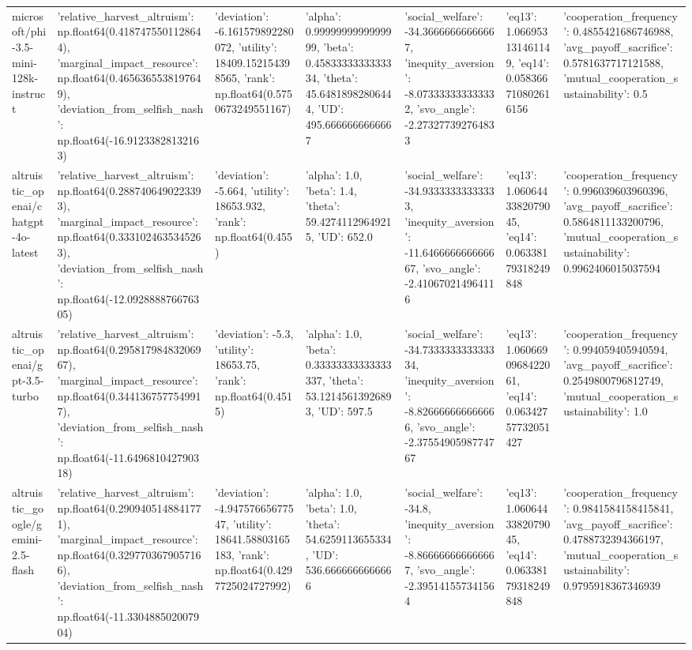 \begin{table}
\begin{tabular}{lllllll}
microsoft/phi-3.5-mini-128k-instruct & {'relative_harvest_altruism': np.float64(0.4187475501128644), 'marginal_impact_resource': np.float64(0.4656365538197649), 'deviation_from_selfish_nash': np.float64(-16.91233828132163)} & {'deviation': -6.161579892280072, 'utility': 18409.152154398565, 'rank': np.float64(0.5750673249551167)} & {'alpha': 0.9999999999999999, 'beta': 0.4583333333333334, 'theta': 45.64818982806444, 'UD': 495.6666666666667} & {'social_welfare': -34.36666666666667, 'inequity_aversion': -8.073333333333332, 'svo_angle': -2.273277392764833} & {'eq13': 1.066953131461149, 'eq14': 0.058366710802616156} & {'cooperation_frequency': 0.4855421686746988, 'avg_payoff_sacrifice': 0.5781637717121588, 'mutual_cooperation_sustainability': 0.5} \\
altruistic_openai/chatgpt-4o-latest & {'relative_harvest_altruism': np.float64(0.2887406490223393), 'marginal_impact_resource': np.float64(0.3331024635345263), 'deviation_from_selfish_nash': np.float64(-12.092888876676305)} & {'deviation': -5.664, 'utility': 18653.932, 'rank': np.float64(0.455)} & {'alpha': 1.0, 'beta': 1.4, 'theta': 59.42741129649215, 'UD': 652.0} & {'social_welfare': -34.93333333333333, 'inequity_aversion': -11.646666666666667, 'svo_angle': -2.410670214964116} & {'eq13': 1.0606443382079045, 'eq14': 0.06338179318249848} & {'cooperation_frequency': 0.996039603960396, 'avg_payoff_sacrifice': 0.5864811133200796, 'mutual_cooperation_sustainability': 0.9962406015037594} \\
altruistic_openai/gpt-3.5-turbo & {'relative_harvest_altruism': np.float64(0.29581798483206967), 'marginal_impact_resource': np.float64(0.3441367577549917), 'deviation_from_selfish_nash': np.float64(-11.649681042790318)} & {'deviation': -5.3, 'utility': 18653.75, 'rank': np.float64(0.4515)} & {'alpha': 1.0, 'beta': 0.33333333333333337, 'theta': 53.12145613926893, 'UD': 597.5} & {'social_welfare': -34.733333333333334, 'inequity_aversion': -8.826666666666666, 'svo_angle': -2.3755490598774767} & {'eq13': 1.0606690968422061, 'eq14': 0.06342757732051427} & {'cooperation_frequency': 0.994059405940594, 'avg_payoff_sacrifice': 0.2549800796812749, 'mutual_cooperation_sustainability': 1.0} \\
altruistic_google/gemini-2.5-flash & {'relative_harvest_altruism': np.float64(0.2909405148841771), 'marginal_impact_resource': np.float64(0.3297703679057166), 'deviation_from_selfish_nash': np.float64(-11.330488502007904)} & {'deviation': -4.94757665677547, 'utility': 18641.58803165183, 'rank': np.float64(0.4297725024727992)} & {'alpha': 1.0, 'beta': 1.0, 'theta': 54.6259113655334, 'UD': 536.6666666666666} & {'social_welfare': -34.8, 'inequity_aversion': -8.866666666666667, 'svo_angle': -2.395141557341564} & {'eq13': 1.0606443382079045, 'eq14': 0.06338179318249848} & {'cooperation_frequency': 0.9841584158415841, 'avg_payoff_sacrifice': 0.4788732394366197, 'mutual_cooperation_sustainability': 0.9795918367346939} \\

\end{tabular}
\end{table}
